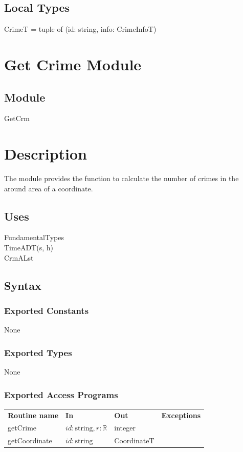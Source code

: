 \documentclass[12pt]{article}
\begin{document}
\subsection*{Local Types}

CrimeT = tuple of (id: string, info: CrimeInfoT)

\newpage

\section* {Get Crime Module}

\subsection*{Module}

GetCrm

\section* {Description}
The module provides the function to calculate the number of crimes in the around area of a coordinate.

\subsection* {Uses}

FundamentalTypes\\
TimeADT(s, h)\\
CrmALst

\subsection* {Syntax}

\subsubsection* {Exported Constants}

None

\subsubsection* {Exported Types}

None

\subsubsection* {Exported Access Programs}
\begin{tabular}{| l | l | l | l |}
\hline
\textbf{Routine name} & \textbf{In} & \textbf{Out} & \textbf{Exceptions}\\
getCrime & $id: \mbox{string}, r: \mathbb{R} $& integer & ~\\
\hline
getCoordinate & $id: \mbox{string} $& CoordinateT & ~\\
\hline
\end{tabular}
\end{document}
